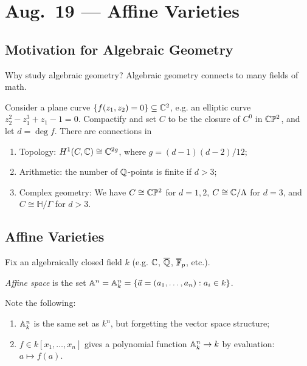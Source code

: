 \chapter{Aug.~19 --- Affine Varieties}

\section{Motivation for Algebraic Geometry}

\begin{remark}
  Why study algebraic geometry? Algebraic
  geometry connects to many fields of math.
\end{remark}

\begin{example}
  Consider a plane curve
  $\{f(z_1, z_2) = 0\} \subseteq \mathbb{C}^2$, e.g.
  an elliptic curve
  $z_2^2 - z_1^3 + z_1 - 1 = 0$.
  Compactify and set $C$ to be
  the closure of $C^0$ in $\mathbb{C} \mathbb{P}^2$, and
  let $d = \deg f$. There are connections in
  \begin{enumerate}
    \item Topology: $H^1(C, \mathbb{C}) \cong \mathbb{C}^{2g}$,
      where $g = (d - 1)(d - 2) / 12$;
    \item Arithmetic: the number of
      $\mathbb{Q}$-points is finite if $d > 3$;
    \item Complex geometry:
      We have $C \cong \mathbb{C} \mathbb{P}^2$ for
      $d = 1, 2$, $C \cong \mathbb{C} / \Lambda$
      for $d = 3$,
      and $C \cong \mathbb{H} / \Gamma$
      for $d > 3$.
  \end{enumerate}
\end{example}

\section{Affine Varieties}

Fix an algebraically closed field $k$ (e.g.
$\mathbb{C}$, $\overline{\mathbb{Q}}$, $\overline{\mathbb{F}}_p$,
etc.).

\begin{definition}
  \emph{Affine space} is the set
  $\mathbb{A}^n = \mathbb{A}^n_k = \{\vec{a} = (a_1, \dots, a_n) : a_i \in k\}$.
\end{definition}

\begin{remark}
  Note the following:
  \begin{enumerate}
    \item $\mathbb{A}^n_k$ is the same set
      as $k^n$, but forgetting the vector
      space structure;
    \item $f \in k[x_1, \dots, x_n]$
      gives a polynomial function
      $\mathbb{A}^n_k \to k$ by evaluation:
      $a \mapsto f(a)$.
  \end{enumerate}
\end{remark}


